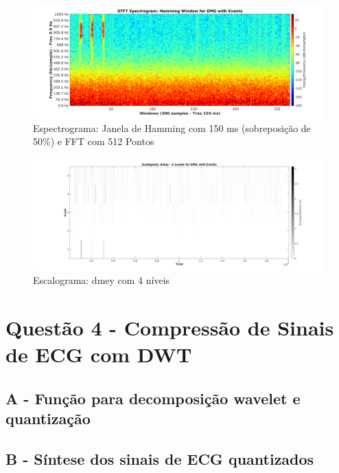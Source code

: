\documentclass{article}
\begin{document}
\begin{figure}[H]
	\begin{center}
		\includegraphics[scale=0.25]{../Q3_Spec.png}
		\caption{Espectrograma: Janela de Hamming com 150 ms (sobreposição de 50\%) e FFT com 512 Pontos}
		\label{fig:Q3_Spec}
	\end{center}
\end{figure}

\begin{figure}[H]
	\begin{center}
		\includegraphics[scale=0.25]{../Q3_Scalo_dmey4.png}
		\caption{Escalograma: dmey com 4 níveis}
		\label{fig:Q3_Scalo}
	\end{center}
\end{figure}


\section*{Questão 4 - Compressão de Sinais de ECG com DWT}
\subsection{A - Função para decomposição wavelet e quantização}


\subsection*{B - Síntese dos sinais de ECG quantizados}

\end{document}
